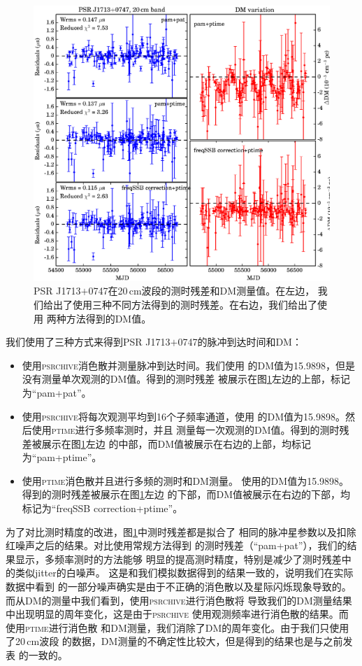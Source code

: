 \begin{figure}
\center
\includegraphics[width=4.5 in]{1713.ps}
\caption{PSR J1713$+$0747在20\,cm波段的测时残差和DM测量值。在左边，
我们给出了使用三种不同方法得到的测时残差。在右边，我们给出了使用
两种方法得到的DM值。
}
\label{1713resi}
\end{figure}

我们使用了三种方式来得到PSR J1713$+$0747的脉冲到达时间和DM：
\begin{itemize}
\item 使用\textsc{psrchive}消色散并测量脉冲到达时间。我们使用
的DM值为15.9898，但是没有测量单次观测的DM值。得到的测时残差
被展示在图\ref{1713resi}左边的上部，标记为“pam+pat”。
\item 使用\textsc{psrchive}将每次观测平均到16个子频率通道，使用
的DM值为15.9898。然后使用\textsc{ptime}进行多频率测时，并且
测量每一次观测的DM值。得到的测时残差被展示在图\ref{1713resi}左边
的中部，而DM值被展示在右边的上部，均标记为“pam+ptime”。
\item 使用\textsc{ptime}消色散并且进行多频的测时和DM测量。
使用的DM值为15.9898。得到的测时残差被展示在图\ref{1713resi}左边
的下部，而DM值被展示在右边的下部，均标记为“freqSSB correction+ptime”。
\end{itemize}

为了对比测时精度的改进，图\ref{1713resi}中测时残差都是拟合了
相同的脉冲星参数以及扣除红噪声之后的结果。对比使用常规方法得到
的测时残差（“pam+pat”），我们的结果显示，多频率测时的方法能够
明显的提高测时精度，特别是减少了测时残差中的类似jitter的白噪声。
这是和我们模拟数据得到的结果一致的，说明我们在实际数据中看到
的一部分噪声确实是由于不正确的消色散以及星际闪烁现象导致的。
而从DM的测量中我们看到，使用\textsc{psrchive}进行消色散将
导致我们的DM测量结果中出现明显的周年变化，这是由于\textsc{psrchive}
使用观测频率进行消色散的结果。而使用\textsc{ptime}进行消色散
和DM测量，我们消除了DM的周年变化。由于我们只使用了20\,cm波段
的数据，DM测量的不确定性比较大，但是得到的结果也是与之前发表
的一致的。


